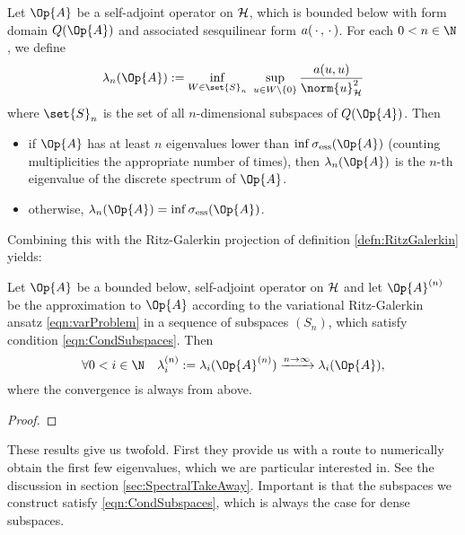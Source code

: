 \begin{thm}
	\label{thm:CourantFischer}
	Let $\Op{A}$ be a self-adjoint operator on $\mathcal{H}$,
	which is bounded below with form domain $Q(\Op{A})$
	and associated sesquilinear form $a(\,\cdot\,,\,\cdot\,)$.
	For each $0 < n \in \N$, we define
	\begin{equation}
		\lambda_n(\Op{A}) := \inf_{W \in \set{S}_n} \ \sup_{u \in W \backslash \{0\}}
		\frac{a(u,u)}{\norm{u}_\hilbert^2}
		\label{eqn:CourantFischer}
	\end{equation}
	where $\set{S}_n$ is the set of all $n$-dimensional subspaces of $Q(\Op{A})$.
	Then
	\begin{itemize}
		\item if $\Op{A}$ has at least $n$ eigenvalues lower
			than $\inf \sigma_\text{ess}(\Op{A})$ (counting multiplicities
			the appropriate number of times),
			then $\lambda_n(\Op{A})$ is the $n$-th eigenvalue of the discrete spectrum
			of $\Op{A}$.
		\item otherwise, $\lambda_n(\Op{A}) = \inf \sigma_\text{ess}(\Op{A})$.
	\end{itemize}
\end{thm}

\noindent
Combining this with the Ritz-Galerkin projection of definition \ref{defn:RitzGalerkin}
yields:

\begin{cor}
	\label{cor:Convergence}
	Let $\Op{A}$ be a bounded below, self-adjoint operator on $\mathcal{H}$
	and let $\Op{A}^{(n)}$ be the approximation to $\Op{A}$
	according to the variational Ritz-Galerkin ansatz
	\eqref{eqn:varProblem}
	in a sequence of subspaces $(S_n)$,
	which satisfy condition \eqref{eqn:CondSubspaces}.
	Then
	\[ \forall 0 < i \in \N \quad \lambda^{(n)}_i := \lambda_i(\Op{A}^{(n)}) \xrightarrow{n\to\infty} \lambda_i(\Op{A}), \]
	where the convergence is always from above.
	\begin{proof}
	\end{proof}
\end{cor}





These results give us twofold.
First they provide us with a route to numerically obtain
the first few eigenvalues, which we are particular interested in.
See the discussion in section \vref{sec:SpectralTakeAway}.
Important is that the subspaces we construct satisfy \eqref{eqn:CondSubspaces},
which is always the case for dense subspaces.

